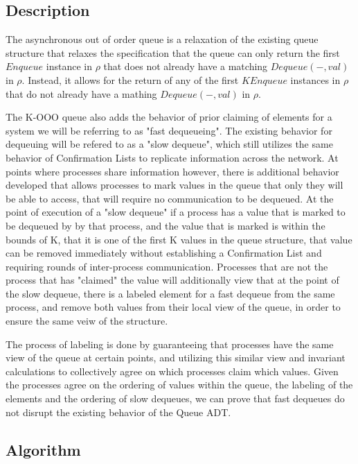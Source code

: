 \documentclass[a4paper,anonymous,USenglish]{lipics-v2021}
\theoremstyle{definition}
\begin{document}
\subsection{Description}

The asynchronous out of order queue is a relaxation of the existing queue structure that relaxes the specification that the queue can only return the first $Enqueue$ instance in $\rho$ that does not already have a matching $Dequeue(-, val)$ in $\rho$. Instead, it allows for the return of any of the first $K Enqueue$ instances in $\rho$ that do not already have a mathing $Dequeue(-, val)$ in $\rho$. 

The K-OOO queue also adds the behavior of prior claiming of elements for a system we will be referring to as "fast dequeueing". The existing behavior for dequeuing will be refered to as a "slow dequeue", which still utilizes the same behavior of Confirmation Lists to replicate information across the network. At points where processes share information however, there is additional behavior developed that allows processes to mark values in the queue that only they will be able to access, that will require no communication to be dequeued. At the point of execution of a "slow dequeue" if a process has a value that is marked to be dequeued by by that process, and the value that is marked is within the bounds of K, that it is one of the first K values in the queue structure, that value can be removed immediately without establishing a Confirmation List and requiring rounds of inter-process communication. Processes that are not the process that has "claimed" the value will additionally view that at the point of the slow dequeue, there is a labeled element for a fast dequeue from the same process, and remove both values from their local view of the queue, in order to ensure the same veiw of the structure. 

The process of labeling is done by guaranteeing that processes have the same view of the queue at certain points, and utilizing this similar view and invariant calculations to collectively agree on which processes claim which values. Given the processes agree on the ordering of values within the queue, the labeling of the elements and the ordering of slow dequeues, we can prove that fast dequeues do not disrupt the existing behavior of the Queue ADT. 
\subsection{Algorithm}
\end{document}
